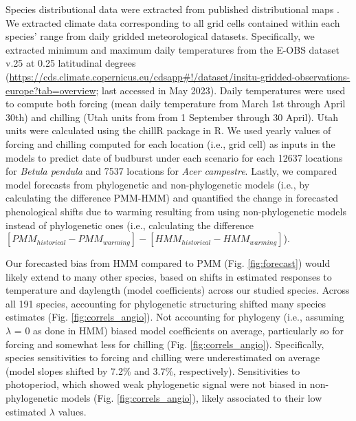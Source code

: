 \documentclass[11pt]{article}
\begin{document}
Species distributional data were extracted from published distributional maps \citep{caudullo2017chorological}. We extracted climate data corresponding to all grid cells contained within each species' range from daily gridded meteorological datasets. Specifically, we extracted minimum and maximum daily temperatures from the E-OBS dataset v.25 at 0.25 latitudinal degrees (\url{https://cds.climate.copernicus.eu/cdsapp#!/dataset/insitu-gridded-observations-europe?tab=overview}; last accessed in May 2023). Daily temperatures were used to compute both forcing (mean daily temperature from March 1st through April 30th) and  chilling (Utah units from from 1 September through 30 April). Utah units were calculated using the chillR package in R. We used yearly values of forcing and chilling computed for each location (i.e., grid cell) as inputs in the models to predict date of budburst under each scenario for each 12637 locations for \emph{Betula pendula} and 7537 locations for \emph{Acer campestre}. Lastly, we compared model forecasts from phylogenetic and non-phylogenetic models (i.e., by calculating the difference PMM-HMM) and quantified the change in forecasted phenological shifts due to warming resulting from using non-phylogenetic models instead of phylogenetic ones (i.e., calculating the difference $[PMM_{historical} -PMM_{warming}]-[HMM_{historical}-HMM_{warming}]$).%

Our forecasted bias from HMM compared to PMM (Fig. \ref{fig:forecast}) would likely extend to many other species, based on shifts in estimated responses to temperature and daylength (model coefficients) across our studied species. Across all 191 species, accounting for phylogenetic structuring shifted many species estimates (Fig. \ref{fig:correls_angio}). Not accounting for phylogeny (i.e., assuming $\lambda$ = 0 as done in HMM) biased model coefficients on average, particularly so for forcing and somewhat less for chilling (Fig. \ref{fig:correls_angio}). Specifically, species sensitivities to forcing and chilling were underestimated on average (model slopes shifted by 7.2\% and 3.7\%, respectively). Sensitivities to photoperiod, which showed weak phylogenetic signal were not biased in non-phylogenetic models (Fig. \ref{fig:correls_angio}), likely associated to their low estimated $\lambda$ values. 
\end{document}
